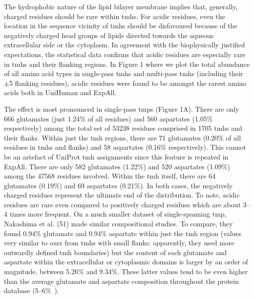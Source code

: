The hydrophobic nature of the lipid bilayer membrane implies that, generally, charged residues should be rare within \gls{tmh}s. For acidic residues, even the location in the sequence vicinity of \gls{tmh}s should be disfavoured because of the negatively charged head groups of lipids directed towards the aqueous extracellular side or the cytoplasm. In agreement with the biophysically justified expectations, the statistical data confirms that acidic residues are especially rare in \gls{tmh}s and their flanking regions. In Figure 1 where we plot the total abundance of all amino acid types in single-pass \gls{tmh}s and multi-pass \gls{tmh}s (including their $\pm$5 flanking residues), acidic residues were found to be amongst the rarest amino acids both in UniHuman and ExpAll.

The effect is most pronounced in single-pass \gls{tmp}s (Figure 1A). There are only 666 glutamates (just 1.24\% of all residues) and 560 aspartates (1.05\% respectively) among the total set of 53238 residues comprised in 1705 \gls{tmh}s and their flanks. Within just the \gls{tmh} regions, there are 71 glutamates (0.20\% of all residues in \gls{tmh}s and flanks) and 58 aspartates (0.16\% respectively). This cannot be an artefact of UniProt \gls{tmh} assignments since this feature is repeated in ExpAll. There are only 582 glutamates (1.22\%) and 520 aspartates (1.09\%) among the 47568 residues involved. Within the \gls{tmh} itself, there are 64 glutamates (0.19\%) and 69 aspartates (0.21\%). In both cases, the negatively charged residues represent the ultimate end of the distribution. To note, acidic residues are rare even compared to positively charged residues which are about 3--4 times more frequent. On a much smaller dataset of single-spanning \gls{tmp}, Nakashima et al. (51) made similar compositional studies. To compare, they found 0.94\% glutamate and 0.94\% aspartate within just the \gls{tmh} region (values very similar to ours from \gls{tmh}s with small flanks; apparently, they used more outwardly defined \gls{tmh} boundaries) but the content of each glutamate and aspartate within the extracellular or cytoplasmic domains is larger by an order of magnitude, between 5.26\% and 9.34\%. These latter values tend to be even higher than the average glutamate and aspartate composition throughout the protein database (5--6\%~\cite{Nakashima1992}).

